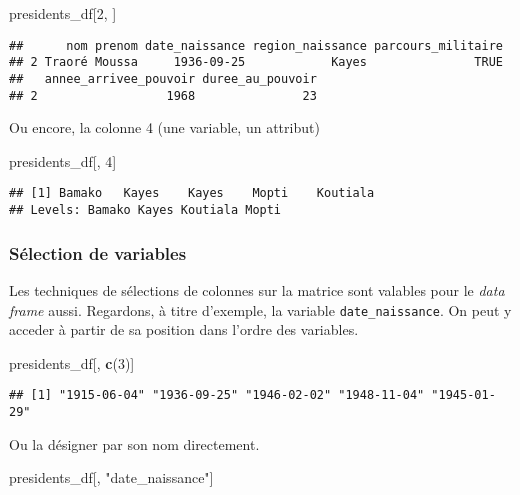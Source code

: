 \documentclass[]{book}
\newenvironment{Shaded}{\begin{snugshade}}{\end{snugshade}}
\newcommand{\KeywordTok}[1]{\textcolor[rgb]{0.13,0.29,0.53}{\textbf{#1}}}
\newcommand{\DecValTok}[1]{\textcolor[rgb]{0.00,0.00,0.81}{#1}}
\newcommand{\StringTok}[1]{\textcolor[rgb]{0.31,0.60,0.02}{#1}}
\newcommand{\NormalTok}[1]{#1}
\begin{document}
\begin{Shaded}
\begin{Highlighting}[]
\NormalTok{presidents_df[}\DecValTok{2}\NormalTok{, ]}
\end{Highlighting}
\end{Shaded}

\begin{verbatim}
##      nom prenom date_naissance region_naissance parcours_militaire
## 2 Traoré Moussa     1936-09-25            Kayes               TRUE
##   annee_arrivee_pouvoir duree_au_pouvoir
## 2                  1968               23
\end{verbatim}

Ou encore, la colonne 4 (une variable, un attribut)

\begin{Shaded}
\begin{Highlighting}[]
\NormalTok{presidents_df[, }\DecValTok{4}\NormalTok{]}
\end{Highlighting}
\end{Shaded}

\begin{verbatim}
## [1] Bamako   Kayes    Kayes    Mopti    Koutiala
## Levels: Bamako Kayes Koutiala Mopti
\end{verbatim}

\subsubsection{Sélection de variables}\label{selection-de-variables}

Les techniques de sélections de colonnes sur la matrice sont valables
pour le \emph{data frame} aussi. Regardons, à titre d'exemple, la
variable \texttt{date\_naissance}. On peut y acceder à partir de sa
position dans l'ordre des variables.

\begin{Shaded}
\begin{Highlighting}[]
\NormalTok{presidents_df[, }\KeywordTok{c}\NormalTok{(}\DecValTok{3}\NormalTok{)]}
\end{Highlighting}
\end{Shaded}

\begin{verbatim}
## [1] "1915-06-04" "1936-09-25" "1946-02-02" "1948-11-04" "1945-01-29"
\end{verbatim}

Ou la désigner par son nom directement.

\begin{Shaded}
\begin{Highlighting}[]
\NormalTok{presidents_df[, }\StringTok{"date_naissance"}\NormalTok{]}
\end{Highlighting}
\end{Shaded}
\end{document}
